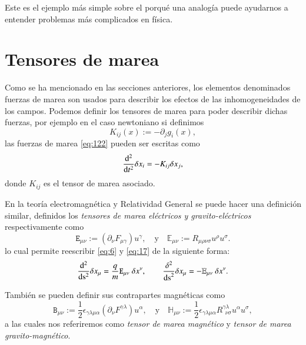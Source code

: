 Este es el ejemplo más simple sobre el porqué una analogía puede ayudarnos a entender problemas más complicados en física.

\section{Tensores de marea}
Como se ha mencionado en las secciones anteriores, los elementos denominados fuerzas de marea son usados para describir los efectos de las inhomogeneidades de los campos. Podemos definir los tensores de marea para poder describir dichas fuerzas, por ejemplo en el caso newtoniano si definimos
\begin{equation}
K_{ij} (x) := - \partial_j g_i(x),
\end{equation}
las fuerzas de marea \eqref{eq:122} pueden ser escritas como
\begin{equation}
\dv[2]{ }{t}\delta x_i = -K_{ij}\delta x_j,
\end{equation}
donde $K_{ij}$ es el tensor de marea asociado.

En la teoría electromagnética y Relatividad General se puede hacer una definición similar, definidos los \textit{tensores de marea eléctricos y gravito-eléctricos} respectivamente como
\begin{equation}
\label{eq:50}
\mathtt{E}_{\mu \nu} := \left( \partial_{\nu} F_{\mu \gamma} \right) u^{\gamma}, \quad 
\mathrm{y } \quad \mathbb{E}_{\mu \nu} := R_{\mu \rho \nu \sigma} u^{\rho} u^{\sigma}.
\end{equation}
lo cual permite reescribir \eqref{eq:6} y \eqref{eq:17} de la siguiente forma:
\begin{equation}
\label{eq:130}
\dv[2]{ }{\s} \delta x_{\mu} = \frac{q}{m} \mathtt{E}_{\mu \nu} \ \delta x^{\nu}
,\qquad
\frac{\delta^2}{\mathrm{ds}^2} \delta x_{\mu} = - \mathbb{E}_{\mu \nu} \ \delta x^{\nu}.
\end{equation}

También se pueden definir sus contrapartes magnéticas como
\begin{equation}
\label{eq:51}
\mathtt{B}_{\mu \nu} := \frac{1}{2} \epsilon_{\gamma \lambda \mu \alpha} \left( \partial_{\nu} F^{\gamma \lambda} \right) u^{\alpha}
,\quad \mathrm{y} \quad
\mathbb{H}_{\mu \nu} := \frac{1}{2} \epsilon_{\gamma \lambda \mu \alpha} R^{\gamma \lambda}_{\ \ \nu \sigma} u^{\alpha} u^{\sigma},
\end{equation}
a las cuales nos referiremos como \textit{tensor de marea magnético} y \textit{tensor de marea gravito-magnético}.

